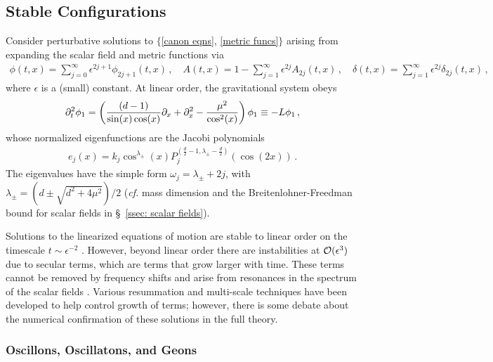 \documentclass[../PhD.tex]{subfiles}
\begin{document}
\subsection{Stable Configurations}

Consider perturbative solutions to $\{$\eqref{canon eqns}, \eqref{metric funcs}$\}$ arising from expanding the scalar field and metric functions via
\begin{align}
\phi(t,x) = \sum_{j=0}^{\infty} \epsilon^{2j + 1} \phi_{2j + 1} (t,x) \, , \quad A(t,x) = 1 - \sum_{j=1}^\infty \epsilon^{2j} A_{2j} (t,x) \, , \quad \delta(t,x) = \sum_{j=1}^\infty \epsilon^{2j} \delta_{2j} (t,x) \, ,
\end{align}
where $\epsilon$ is a (small) constant. At linear order, the gravitational system obeys
\begin{align}
\label{collapse eigen eqn}
\partial_t^2 \phi_1 = \left( \frac{ (d-1)}{\sin (x) \cos (x)} \partial_x + \partial^2_x - \frac{\mu^2}{\cos^2 (x)} \right) \phi_1 \equiv - L \phi_1 \, ,
\end{align}
whose normalized eigenfunctions are the Jacobi polynomials
\begin{align}
\label{scalar eigens}
e_j (x) = k_j \cos^{\lambda_\pm}(x) P_j^{(\frac{d}{2} - 1, \lambda_\pm - \frac{d}{2})} \left( \cos \left( 2x \right)\right) \, .
\end{align}
The eigenvalues have the simple form $\omega_j = \lambda_\pm + 2j$, with $\lambda_\pm = (d \pm \sqrt{d^2 + 4\mu^2})/2$ ({\it cf.} mass dimension and the Breitenlohner-Freedman bound for scalar fields in \S~\!\ref{ssec: scalar fields}). 

Solutions to the linearized equations of motion are stable to linear order on the timescale $t \sim \epsilon^{-2}$ \cite{1506.07907}. However, beyond linear order there are instabilities at $\mathcal O(\epsilon^3)$ due to secular terms, which are terms that grow larger with time. These terms cannot be removed by frequency shifts and arise from resonances in the spectrum of the scalar fields  \cite{1407.6273}. Various resummation \cite{hep-th/9506161} and multi-scale techniques \cite{1403.6471} have been developed to help control growth of terms; however, there is some debate about the numerical confirmation of these solutions in the full theory.

\subsubsection{Oscillons, Oscillatons, and Geons}
\label{sub: geons}
\end{document}
